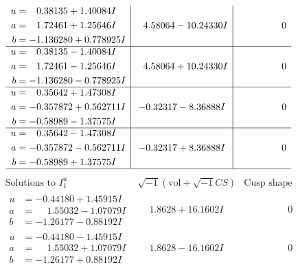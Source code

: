 \documentclass[1p]{elsarticle_modified}
\theoremstyle{definition}
\newcommand{\I}{\sqrt{-1}}
\begin{document}
$$\begin{array}{c|c|c}
\begin{aligned}
u &= \phantom{-}0.38135 + 1.40084 I \\
a &= \phantom{-}1.72461 + 1.25646 I \\
b &= -1.136280 + 0.778925 I\end{aligned}
 & \phantom{-}4.58064 - 10.24330 I & \phantom{-0.000000 } 0 \\ \hline\begin{aligned}
u &= \phantom{-}0.38135 - 1.40084 I \\
a &= \phantom{-}1.72461 - 1.25646 I \\
b &= -1.136280 - 0.778925 I\end{aligned}
 & \phantom{-}4.58064 + 10.24330 I & \phantom{-0.000000 } 0 \\ \hline\begin{aligned}
u &= \phantom{-}0.35642 + 1.47308 I \\
a &= -0.357872 + 0.562711 I \\
b &= -0.58989 - 1.37575 I\end{aligned}
 & -0.32317 - 8.36888 I & \phantom{-0.000000 } 0 \\ \hline\begin{aligned}
u &= \phantom{-}0.35642 - 1.47308 I \\
a &= -0.357872 - 0.562711 I \\
b &= -0.58989 + 1.37575 I\end{aligned}
 & -0.32317 + 8.36888 I & \phantom{-0.000000 } 0\\
 \hline 
 \end{array}$$\newpage$$\begin{array}{c|c|c}  
\text{Solutions to }I^u_{1}& \I (\text{vol} + \sqrt{-1}CS) & \text{Cusp shape}\\
 \hline 
\begin{aligned}
u &= -0.44180 + 1.45915 I \\
a &= \phantom{-}1.55032 - 1.07079 I \\
b &= -1.26177 - 0.88192 I\end{aligned}
 & \phantom{-}1.8628 + 16.1602 I & \phantom{-0.000000 } 0 \\ \hline\begin{aligned}
u &= -0.44180 - 1.45915 I \\
a &= \phantom{-}1.55032 + 1.07079 I \\
b &= -1.26177 + 0.88192 I\end{aligned}
 & \phantom{-}1.8628 - 16.1602 I & \phantom{-0.000000 } 0 \\ \hline\begin{aligned}

\end{aligned}
\end{array}$$
\end{document}
